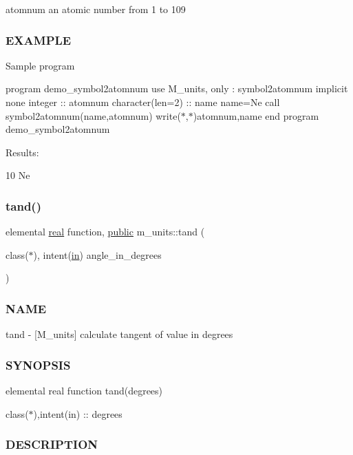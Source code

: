 atomnum an atomic number from 1 to 109

\subsubsection*{E\+X\+A\+M\+P\+LE}

Sample program

program demo\+\_\+symbol2atomnum use M\+\_\+units, only \+: symbol2atomnum implicit none integer \+:\+: atomnum character(len=2) \+:\+: name name=\textquotesingle{}Ne\textquotesingle{} call symbol2atomnum(name,atomnum) write($\ast$,$\ast$)atomnum,name end program demo\+\_\+symbol2atomnum

Results\+:

10 Ne \mbox{\label{namespacem__units_ac2c6550d996061015c6b4178048e4967}} 
\subsubsection{\texorpdfstring{tand()}{tand()}}
{\footnotesize\ttfamily elemental \hyperlink{read__watch_83_8txt_abdb62bde002f38ef75f810d3a905a823}{real} function, \hyperlink{M__stopwatch_83_8txt_a2f74811300c361e53b430611a7d1769f}{public} m\+\_\+units\+::tand (\begin{DoxyParamCaption}\item[{class($\ast$), intent(\hyperlink{M__journal_83_8txt_afce72651d1eed785a2132bee863b2f38}{in})}]{angle\+\_\+in\+\_\+degrees }\end{DoxyParamCaption})}



\subsubsection*{N\+A\+ME}

tand -\/ \mbox{[}M\+\_\+units\mbox{]} calculate tangent of value in degrees \subsubsection*{S\+Y\+N\+O\+P\+S\+IS}

elemental real function tand(degrees)

class($\ast$),intent(in) \+:\+: degrees \subsubsection*{D\+E\+S\+C\+R\+I\+P\+T\+I\+ON}

